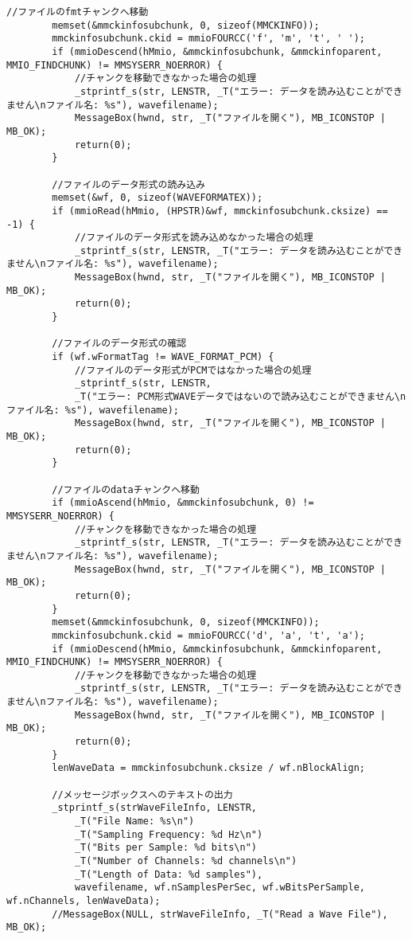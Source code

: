 \begin{lstlisting}[caption=main.cpp]
		//ファイルのfmtチャンクへ移動
		memset(&mmckinfosubchunk, 0, sizeof(MMCKINFO));
		mmckinfosubchunk.ckid = mmioFOURCC('f', 'm', 't', ' ');
		if (mmioDescend(hMmio, &mmckinfosubchunk, &mmckinfoparent, MMIO_FINDCHUNK) != MMSYSERR_NOERROR) {
			//チャンクを移動できなかった場合の処理
			_stprintf_s(str, LENSTR, _T("エラー: データを読み込むことができません\nファイル名: %s"), wavefilename);
			MessageBox(hwnd, str, _T("ファイルを開く"), MB_ICONSTOP | MB_OK);
			return(0);
		}

		//ファイルのデータ形式の読み込み
		memset(&wf, 0, sizeof(WAVEFORMATEX));
		if (mmioRead(hMmio, (HPSTR)&wf, mmckinfosubchunk.cksize) == -1) {
			//ファイルのデータ形式を読み込めなかった場合の処理
			_stprintf_s(str, LENSTR, _T("エラー: データを読み込むことができません\nファイル名: %s"), wavefilename);
			MessageBox(hwnd, str, _T("ファイルを開く"), MB_ICONSTOP | MB_OK);
			return(0);
		}

		//ファイルのデータ形式の確認
		if (wf.wFormatTag != WAVE_FORMAT_PCM) {
			//ファイルのデータ形式がPCMではなかった場合の処理
			_stprintf_s(str, LENSTR, 
			_T("エラー: PCM形式WAVEデータではないので読み込むことができません\nファイル名: %s"), wavefilename);
			MessageBox(hwnd, str, _T("ファイルを開く"), MB_ICONSTOP | MB_OK);
			return(0);
		}

		//ファイルのdataチャンクへ移動
		if (mmioAscend(hMmio, &mmckinfosubchunk, 0) != MMSYSERR_NOERROR) {
			//チャンクを移動できなかった場合の処理
			_stprintf_s(str, LENSTR, _T("エラー: データを読み込むことができません\nファイル名: %s"), wavefilename);
			MessageBox(hwnd, str, _T("ファイルを開く"), MB_ICONSTOP | MB_OK);
			return(0);
		}
		memset(&mmckinfosubchunk, 0, sizeof(MMCKINFO));
		mmckinfosubchunk.ckid = mmioFOURCC('d', 'a', 't', 'a');
		if (mmioDescend(hMmio, &mmckinfosubchunk, &mmckinfoparent, MMIO_FINDCHUNK) != MMSYSERR_NOERROR) {
			//チャンクを移動できなかった場合の処理
			_stprintf_s(str, LENSTR, _T("エラー: データを読み込むことができません\nファイル名: %s"), wavefilename);
			MessageBox(hwnd, str, _T("ファイルを開く"), MB_ICONSTOP | MB_OK);
			return(0);
		}
		lenWaveData = mmckinfosubchunk.cksize / wf.nBlockAlign;

		//メッセージボックスへのテキストの出力
		_stprintf_s(strWaveFileInfo, LENSTR,
			_T("File Name: %s\n")
			_T("Sampling Frequency: %d Hz\n")
			_T("Bits per Sample: %d bits\n")
			_T("Number of Channels: %d channels\n")
			_T("Length of Data: %d samples"),
			wavefilename, wf.nSamplesPerSec, wf.wBitsPerSample, wf.nChannels, lenWaveData);
		//MessageBox(NULL, strWaveFileInfo, _T("Read a Wave File"), MB_OK);


\end{lstlisting}
